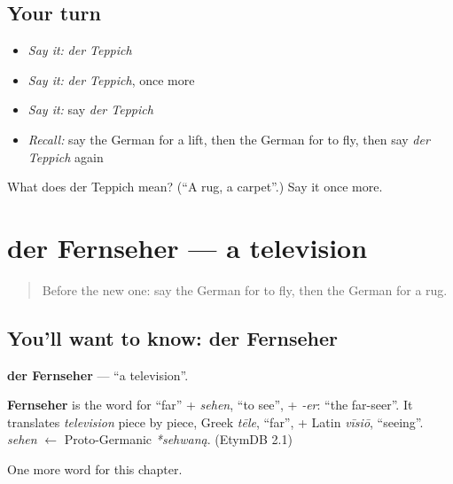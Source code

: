 \subsection*{Your turn}
\begin{itemize}
\raggedright
  \item \emph{Say it:} \emph{der Teppich}
  \item \emph{Say it:} \emph{der Teppich}, once more
  \item \emph{Say it:} say \emph{der Teppich}
  \item \emph{Recall:} say the German for a lift, then the German for to fly, then say \emph{der Teppich} again
\end{itemize}

\begin{tcolorbox}[breakable,colback=teal!4,colframe=teal!35!black,title={Before you move on}]
What does der Teppich mean? (\textquotedblleft{}A rug, a carpet\textquotedblright{}.) Say it once more.
\end{tcolorbox}
\section[der Fernseher]{der Fernseher — a television}

\label{lesson:GE-C112-fernseher}



\begin{quote}
Before the new one: say the German for to fly, then the German for a rug.
\end{quote}

\subsection*{You'll want to know: der Fernseher}
\textbf{der Fernseher} — \textquotedblleft{}a television\textquotedblright{}.

\begin{cousinweb}
\textbf{Fernseher} is the word for \textquotedblleft{}far\textquotedblright{} + \emph{sehen}, \textquotedblleft{}to see\textquotedblright{}, + \emph{-er}: \textquotedblleft{}the far-seer\textquotedblright{}. It translates \emph{television} piece by piece, Greek \emph{tēle}, \textquotedblleft{}far\textquotedblright{}, + Latin \emph{vīsiō}, \textquotedblleft{}seeing\textquotedblright{}. \emph{sehen} $\leftarrow$ Proto-Germanic \emph{*sehwaną}. (EtymDB 2.1)
\end{cousinweb}

\begin{grammarlens}[title={What you've built}]
One more word for this chapter.
\end{grammarlens}

